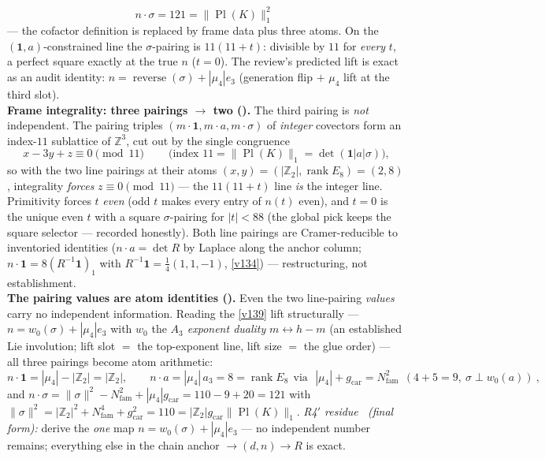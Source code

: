 \documentclass[11pt,a4paper]{article}
\newcommand{\Nfam}{N_{\mathrm{fam}}}
\newcommand{\gcar}{g_{\mathrm{car}}}
\newcommand{\Z}{\mathbb Z}
\begin{document}
\begin{keybox}
\[{  n\cdot\sigma=121=\|\operatorname{Pl}(K)\|_1^2\ }
\]
--- the cofactor definition is replaced by frame data plus three atoms. On the $(\mathbf1,a)$-constrained
line the $\sigma$-pairing is $11(11{+}t)$: divisible by $11$ for \emph{every} $t$, a perfect square
exactly at the true $n$ ($t{=}0$). The review's predicted lift is exact as an audit identity:
$n=\operatorname{reverse}(\sigma)+|\mu_4|e_3$ (generation flip $+$ $\mu_4$ lift at the third slot).
\smallskip\\
\noindent\textbf{Frame integrality: three pairings $\to$ two ().}
The third pairing is \emph{not} independent. The pairing triples $(m\cdot\mathbf1, m\cdot a,
m\cdot\sigma)$ of \emph{integer} covectors form an index-$11$ sublattice of $\Z^3$, cut out by the single
congruence
\[
  \boxed{\ x-3y+z\equiv0 \pmod{11}\ }\qquad\text{(index $11=\|\operatorname{Pl}(K)\|_1=\det(\mathbf1|a|\sigma)$)},
\]
so with the two line pairings at their atoms $(x,y)=(|\Z_2|,\operatorname{rank}E_8)=(2,8)$, integrality
\emph{forces} $z\equiv0\pmod{11}$ --- the $11(11{+}t)$ line \emph{is} the integer line. Primitivity
forces $t$ \emph{even} (odd $t$ makes every entry of $n(t)$ even), and $t{=}0$ is the unique even $t$
with a square $\sigma$-pairing for $|t|<88$ (the global pick keeps the square selector --- recorded
honestly). Both line pairings are Cramer-reducible to inventoried identities ($n\cdot a=\det R$ by
Laplace along the anchor column; $n\cdot\mathbf1=8(R^{-1}\mathbf1)_1$ with $R^{-1}\mathbf1=\tfrac14(1,1,-1)$,
\vref{v134}) --- restructuring, not establishment.
\smallskip\\
\noindent\textbf{The pairing values are atom identities ().} Even the two
line-pairing \emph{values} carry no independent information. Reading the \vref{v139} lift structurally ---
$n=w_0(\sigma)+|\mu_4|e_3$ with $w_0$ the \emph{$A_3$ exponent duality} $m\leftrightarrow h{-}m$ (an
established Lie involution; lift slot $=$ the top-exponent line, lift size $=$ the glue order) --- all
three pairings become atom arithmetic:
\[
  n\cdot\mathbf1=|\mu_4|-|\Z_2|=|\Z_2|,\qquad
  n\cdot a=|\mu_4|\,a_3=8=\operatorname{rank}E_8\ \ \text{via}\ \
  \boxed{\ |\mu_4|+\gcar=\Nfam^2\ \ (4+5=9,\ \sigma\perp w_0(a))\ },
\]
and $n\cdot\sigma=\|\sigma\|^2-\Nfam^2+|\mu_4|\gcar=110-9+20=121$ with
$\|\sigma\|^2=|\Z_2|^2+\Nfam^4+\gcar^2=110=|\Z_2|\gcar\|\operatorname{Pl}(K)\|_1$.
\emph{R4$'$ residue \mC\ (final form):} derive the \emph{one} map $n=w_0(\sigma)+|\mu_4|e_3$ --- no
independent number remains; everything else in the chain anchor $\to(d,n)\to R$ is exact.

\end{keybox}
\end{document}
